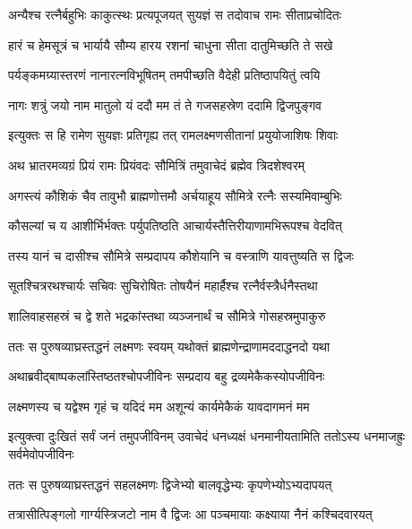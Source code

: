 \twolineshloka
{अन्यैश्च रत्नैर्बहुभिः काकुत्स्थः प्रत्यपूजयत्}
{सुयज्ञं स तदोवाच रामः सीताप्रचोदितः} %

\twolineshloka
{हारं च हेमसूत्रं च भार्यायै सौम्य हारय}
{रशनां चाधुना सीता दातुमिच्छति ते सखे} %

\twolineshloka
{पर्यङ्कमग्र्यास्तरणं नानारत्नविभूषितम्}
{तमपीच्छति वैदेही प्रतिष्ठापयितुं त्वयि} %

\twolineshloka
{नागः शत्रुं जयो नाम मातुलो यं ददौ मम}
{तं ते गजसहस्रेण ददामि द्विजपुङ्गव} %

\twolineshloka
{इत्युक्तः स हि रामेण सुयज्ञः प्रतिगृह्य तत्}
{रामलक्ष्मणसीतानां प्रयुयोजाशिषः शिवाः} %

\twolineshloka
{अथ भ्रातरमव्यग्रं प्रियं रामः प्रियंवदः}
{सौमित्रिं तमुवाचेदं ब्रह्मेव त्रिदशेश्वरम्} %

\twolineshloka
{अगस्त्यं कौशिकं चैव तावुभौ ब्राह्मणोत्तमौ}
{अर्चयाहूय सौमित्रे रत्नैः सस्यमिवाम्बुभिः} %

\twolineshloka
{कौसल्यां च य आशीर्भिर्भक्तः पर्युपतिष्ठति}
{आचार्यस्तैत्तिरीयाणामभिरूपश्च वेदवित्} %

\twolineshloka
{तस्य यानं च दासीश्च सौमित्रे सम्प्रदापय}
{कौशेयानि च वस्त्राणि यावत्तुष्यति स द्विजः} %

\twolineshloka
{सूतश्चित्ररथश्चार्यः सचिवः सुचिरोषितः}
{तोषयैनं महार्हैश्च रत्नैर्वस्त्रैर्धनैस्तथा} %

\twolineshloka
{शालिवाहसहस्रं च द्वे शते भद्रकांस्तथा}
{व्यञ्जनार्थं च सौमित्रे गोसहस्रमुपाकुरु} %

\twolineshloka
{ततः स पुरुषव्याघ्रस्तद्धनं लक्ष्मणः स्वयम्}
{यथोक्तं ब्राह्मणेन्द्राणामददाद्धनदो यथा} %

\twolineshloka
{अथाब्रवीद्बाष्पकलांस्तिष्ठतश्चोपजीविनः}
{सम्प्रदाय बहु द्रव्यमेकैकस्योपजीविनः} %

\twolineshloka
{लक्ष्मणस्य च यद्वेश्म गृहं च यदिदं मम}
{अशून्यं कार्यमेकैकं यावदागमनं मम} %

\threelineshloka
{इत्युक्त्वा दुःखितं सर्वं जनं तमुपजीविनम्}
{उवाचेदं धनध्यक्षं धनमानीयतामिति}
{ततोऽस्य धनमाजह्रुः सर्वमेवोपजीविनः} %

\twolineshloka
{ततः स पुरुषव्याघ्रस्तद्धनं सहलक्ष्मणः}
{द्विजेभ्यो बालवृद्धेभ्यः कृपणेभ्योऽभ्यदापयत्} %

\twolineshloka
{तत्रासीत्पिङ्गलो गार्ग्यस्त्रिजटो नाम वै द्विजः}
{आ पञ्चमायाः कक्ष्याया नैनं कश्चिदवारयत्} %

